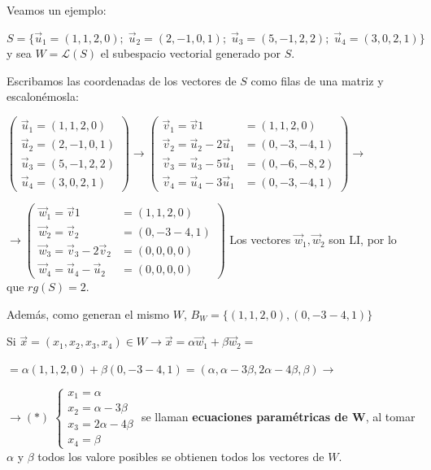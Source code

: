 \begin{cuadro-gris}

Veamos un ejemplo:

\noindent \small{$S=\{\vec u_1=(1,1,2,0); \; \vec u_2=(2,-1,0,1); \; \vec u_3=(5,-1,2,2); \; \vec u_4=(3,0,2,1) \}$} \normalsize{ y} sea $W=\mathcal L(S)$ el subespacio vectorial generado por $S$.

\noindent Escribamos las coordenadas de los vectores de $S$ como filas de una matriz y escalonémosla:

\noindent $\left (\begin{matrix}  \vec u_1=(1,1,2,0) \\ \vec u_2=(2,-1,0,1) \\ \vec u_3=(5,-1,2,2) \\ \vec u_4=(3,0,2,1) \end{matrix} \right) \to \left (\begin{matrix} \vec v_1= \vec v1 &= (1,1,2,0) \\ \vec v_2=\vec u_2-2\vec u_1 &=(0,-3,-4,1) \\ \vec v_3=\vec u_3-5\vec u_1 &=(0,-6,-8,2) \\ \vec v_4=\vec u_4-3\vec u_1 &=(0,-3,-4,1)    \end{matrix} \right) \to $

\noindent $\to \left (\begin{matrix} \vec w_1=\vec v1 &=(1,1,2,0) \\ \vec w_2=\vec v_2 &=(0,-3-4,1) \\ \vec w_3=\vec v_3-2\vec v_2 &=(0,0,0,0) \\ \vec w_4=\vec u_4-\vec u_2 &=(0,0,0,0) \end{matrix} \right)$ Los vectores $\vec w_1, \vec w_2$ son LI, por lo que $rg(S)=2$.

\noindent Además, como generan el mismo $W$, $B_W=\{(1,1,2,0), (0,-3-4,1) \}$

\noindent Si $\vec x=(x_1,x_2,x_3,x_4) \in W \to \vec x=\alpha \vec w_1 + \beta \vec w_2 = $

\noindent $=\alpha (1,1,2,0) + \beta (0,-3-4,1)=(\alpha , \alpha-3\beta, 2\alpha-4\beta, \beta) \to $

\noindent \small{$\to (*)\; \begin{cases} x_1=\alpha \\ x_2= \alpha-3\beta \\ x_3= 2\alpha-4\beta \\ x_4= \beta  \end{cases}$} \normalsize{se} llaman \textbf{ecuaciones paramétricas de W}, 
al tomar $\alpha$ y $\beta$ todos los valore posibles se obtienen todos los vectores de $W$.


\end{cuadro-gris}

